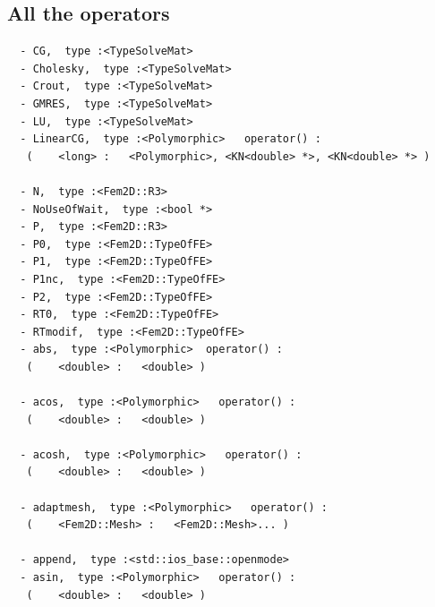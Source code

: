 \documentclass[a4paper,twoside,12pt]{book}
\begin{document}
{%




\subsection{All the operators}
\begin{verbatim}
  - CG,  type :<TypeSolveMat>
  - Cholesky,  type :<TypeSolveMat>
  - Crout,  type :<TypeSolveMat>
  - GMRES,  type :<TypeSolveMat>
  - LU,  type :<TypeSolveMat>
  - LinearCG,  type :<Polymorphic>   operator() :
   (    <long> :   <Polymorphic>, <KN<double> *>, <KN<double> *> )

  - N,  type :<Fem2D::R3>
  - NoUseOfWait,  type :<bool *>
  - P,  type :<Fem2D::R3>
  - P0,  type :<Fem2D::TypeOfFE>
  - P1,  type :<Fem2D::TypeOfFE>
  - P1nc,  type :<Fem2D::TypeOfFE>
  - P2,  type :<Fem2D::TypeOfFE>
  - RT0,  type :<Fem2D::TypeOfFE>
  - RTmodif,  type :<Fem2D::TypeOfFE>
  - abs,  type :<Polymorphic>  operator() :
   (    <double> :   <double> )

  - acos,  type :<Polymorphic>   operator() :
   (    <double> :   <double> )

  - acosh,  type :<Polymorphic>   operator() :
   (    <double> :   <double> )

  - adaptmesh,  type :<Polymorphic>   operator() :
   (    <Fem2D::Mesh> :   <Fem2D::Mesh>... )

  - append,  type :<std::ios_base::openmode>
  - asin,  type :<Polymorphic>   operator() :
   (    <double> :   <double> )


\end{verbatim}}
\end{document}
